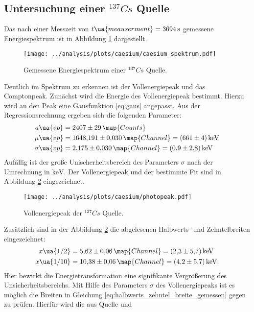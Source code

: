 \subsection{Untersuchung einer $^{137}{Cs}$ Quelle}
Das nach einer Messzeit von $t\ua{meauserment}=\SI{3694}{\second}$ gemessene
Energiespektrum ist in Abbildung \ref{fig:caesium_spektrum} dargestellt.
\begin{figure}
  \centering
  \texttt{[image: ../analysis/plots/caesium/caesium\_spektrum.pdf]}
  \caption{Gemessene Energiespektrum einer $^{137}{Cs}$ Quelle.}
  \label{fig:caesium_spektrum}
\end{figure}
Deutlich im Spektrum zu erkennen ist der Vollenergiepeak und das Comptonpeak.
Zunächst wird die Energie des Vollenergiepeak bestimmt. Hierzu wird an den Peak
eine Gausfunktion \eqref{eq:gaus} angepasst. Aus der Regressionsrechnung ergeben
sich die folgenden Parameter:
\begin{align*}
  a\ua{vp}&=\num{2407\pm29}\,\map{Counts}\\
  \mu\ua{vp}&=\num{1648.191\pm0.030}\,\map{Channel}=\SI{661\pm4}{\kilo\eV} \\ \sigma\ua{vp}&=\num{2.175\pm0.030}\,\map{Channel}=\SI{0.9\pm2.8}{\kilo\eV}
\end{align*}
Aufällig ist der große Unischerheitsbereich des Parameters $\sigma$ nach der Umrechnung in $\si{\kilo\eV}$.
Der Vollenergiepeak und der bestimmte Fit sind in Abbildung \ref{fig:Vollenergiepeak} eingezeichnet.
\begin{figure}
  \centering
  \texttt{[image: ../analysis/plots/caesium/photopeak.pdf]}
  \caption{Vollenergiepeak der $^{137}{Cs}$ Quelle.}
  \label{fig:Vollenergiepeak}
\end{figure}
Zusätzlich sind in der Abbildung \ref{fig:Vollenergiepeak} die abgelesenen
Halbwerts- und Zehntelbreiten eingezeichnet:
\begin{align}
  \label{eq:halbwerts_zehntel_breite_gemessen}
  x\ua{1/2}&=\num{5.62\pm0.06}\,\map{Channel} = \SI{2.3\pm5.7}{\kilo\eV}\\
  x\ua{1/10}&=\num{10.38\pm0.06}\,\map{Channel} = \SI{4.2\pm5.7}{\kilo\eV}.
\end{align}
Hier bewirkt die Energietransformation eine signifikante Vergrößerung des Unsicherheitsbereichs.
Mit Hilfe des Parameters $\sigma$ des Vollenergiepeaks ist es möglich die
Breiten in Gleichung \eqref{eq:halbwerts_zehntel_breite_gemessen} gegen zu prüfen.
Hierfür wird die aus Quelle \cite{halbwertsbreite} und \cite{anleitungV18}
